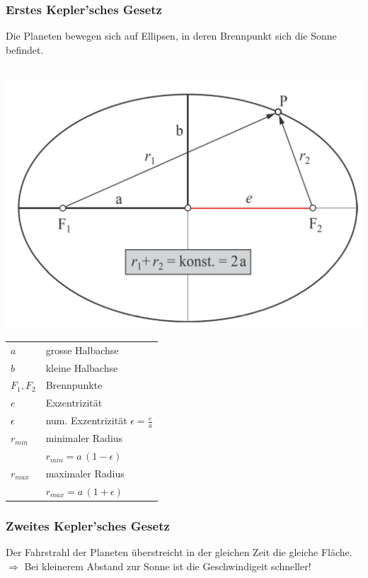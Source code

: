 		\subsubsection{Erstes Kepler'sches Gesetz}
			Die Planeten bewegen sich auf Ellipsen, in deren Brennpunkt sich die Sonne befindet. \\
			\\
			\begin{minipage}{0.45\linewidth}
				\includegraphics[width=\linewidth]{Bilder/ellipse}
			\end{minipage}
			\hfill
			\begin{minipage}{0.53\linewidth}
				\begin{tabular}{ll}
					$a$ & grosse Halbachse \\
					$b$ & kleine Halbachse \\
					$F_1, F_2$ & Brennpunkte \\
					$e$ & Exzentrizität \\
					$\epsilon$ & num. Exzentrizität $\epsilon = \frac{e}{a} $\\	
					$r_{min}$ & minimaler Radius \\	
					& $r_{min} = a \,(1 - \epsilon)$ \\
					$r_{max}$ & maximaler Radius \\
					& $r_{max} = a \,(1 + \epsilon)$ \\
				\end{tabular}
			\end{minipage}

		\subsubsection{Zweites Kepler'sches Gesetz}
			Der Fahrstrahl der Planeten überstreicht in der gleichen Zeit die gleiche Fläche. \\
			$\Rightarrow$ Bei kleinerem Abstand zur Sonne ist die Geschwindigeit schneller! \\
		
